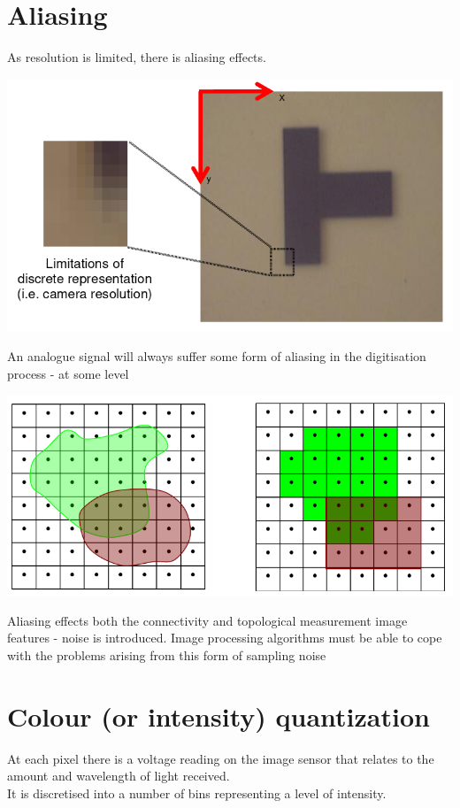 \documentclass{article}[18pt]
\begin{document}
\section{Aliasing}
As resolution is limited, there is aliasing effects.
\begin{center}
	\includegraphics[scale=0.7]{Aliasing}
\end{center}
An analogue signal will always suffer some form of aliasing in the digitisation process - at some level
\begin{center}
	\includegraphics[scale=0.7]{Aliasing1}
\end{center}
Aliasing effects both the connectivity and topological measurement image features - noise is introduced. Image processing algorithms must be able to cope with the problems arising from this form of sampling noise
\section{Colour (or intensity) quantization}
At each pixel there is a voltage reading on the image sensor that relates to the amount and wavelength of light received.\\
It is discretised into a number of bins representing a level of intensity.
\end{document}
